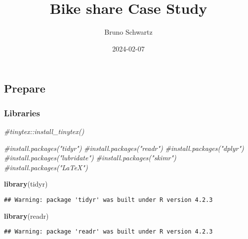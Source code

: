 \documentclass[
]{article}
\title{Bike share Case Study}
\author{Bruno Schwartz}
\date{2024-02-07}
\newenvironment{Shaded}{\begin{snugshade}}{\end{snugshade}}
\newcommand{\CommentTok}[1]{\textcolor[rgb]{0.56,0.35,0.01}{\textit{#1}}}
\newcommand{\FunctionTok}[1]{\textcolor[rgb]{0.13,0.29,0.53}{\textbf{#1}}}
\newcommand{\NormalTok}[1]{#1}
\begin{document}
\maketitle

\hypertarget{prepare}{%
\subsection{Prepare}\label{prepare}}

\hypertarget{libraries}{%
\subsubsection{Libraries}\label{libraries}}

\begin{Shaded}
\begin{Highlighting}[]
\CommentTok{\#tinytex::install\_tinytex()}
\end{Highlighting}
\end{Shaded}

\begin{Shaded}
\begin{Highlighting}[]
\CommentTok{\#install.packages("tidyr")}
\CommentTok{\#install.packages("readr")}
\CommentTok{\#install.packages("dplyr")}
\CommentTok{\#install.packages("lubridate")}
\CommentTok{\#install.packages("skimr")}
\CommentTok{\#install.packages("LaTeX")}
\end{Highlighting}
\end{Shaded}

\begin{Shaded}
\begin{Highlighting}[]
\FunctionTok{library}\NormalTok{(tidyr)}
\end{Highlighting}
\end{Shaded}

\begin{verbatim}
## Warning: package 'tidyr' was built under R version 4.2.3
\end{verbatim}

\begin{Shaded}
\begin{Highlighting}[]
\FunctionTok{library}\NormalTok{(readr)}
\end{Highlighting}
\end{Shaded}

\begin{verbatim}
## Warning: package 'readr' was built under R version 4.2.3
\end{verbatim}
\end{document}
